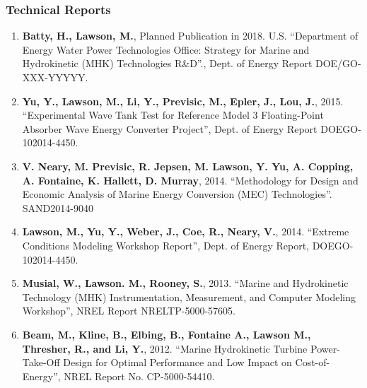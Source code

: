 \subsubsection*{Technical Reports}
\vspace{-0.15in}

\begin{enumerate}[leftmargin=1.5pc,itemsep=0pt,parsep=0pt,topsep=0pt,partopsep=1pt]

\item \textbf{Batty, H., Lawson, M.}, Planned Publication in 2018. U.S. ``Department of Energy Water Power Technologies Office: Strategy for Marine and Hydrokinetic (MHK) Technologies R\&D''., Dept. of Energy Report DOE/GO-XXX-YYYYY.

\item \textbf{Yu, Y., Lawson, M., Li, Y., Previsic, M., Epler, J., Lou, J.}, 2015. ``Experimental Wave Tank Test for Reference Model 3 Floating-Point Absorber Wave Energy Converter Project'', Dept. of Energy Report DOE\/GO-102014-4450.

\item \textbf{V. Neary, M. Previsic, R. Jepsen, M. Lawson, Y. Yu, A. Copping, A. Fontaine, K. Hallett, D. Murray}, 2014. ``Methodology for Design and Economic Analysis of Marine Energy Conversion (MEC) Technologies''. SAND2014-9040

\item \textbf{Lawson, M., Yu, Y., Weber, J., Coe, R., Neary, V.}, 2014. ``Extreme Conditions Modeling Workshop Report'', Dept. of Energy Report, DOE\/GO-102014-4450.

\item \textbf{Musial, W., Lawson. M., Rooney, S.}, 2013. ``Marine and Hydrokinetic Technology (MHK) Instrumentation, Measurement, and Computer Modeling Workshop'', NREL Report NREL\/TP-5000-57605.

\item \textbf{Beam, M., Kline, B., Elbing, B., Fontaine A., Lawson M., Thresher, R., and Li, Y.}, 2012. ``Marine Hydrokinetic Turbine Power-Take-Off Design for Optimal Performance and Low Impact on Cost-of-Energy'', NREL Report No. CP-5000-54410.

\end{enumerate}

